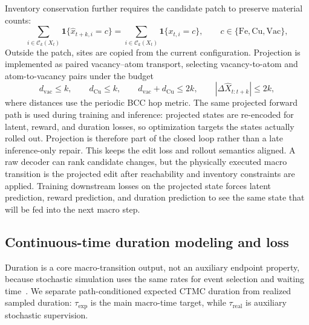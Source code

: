 \documentclass{article}
\begin{document}
Inventory conservation further requires the candidate patch to preserve material counts:
\begin{equation}
\sum_{i\in\mathcal{C}_k(X_t)}\mathbf{1}\{\hat{x}_{t+k,i}=c\}
=
\sum_{i\in\mathcal{C}_k(X_t)}\mathbf{1}\{x_{t,i}=c\},
\qquad c\in\{\mathrm{Fe},\mathrm{Cu},\mathrm{Vac}\},
\end{equation}
Outside the patch, sites are copied from the current configuration. Projection is implemented as paired vacancy--atom transport, selecting vacancy-to-atom and atom-to-vacancy pairs under the budget
\begin{equation}
d_{\mathrm{vac}}\leq k,\qquad d_{\mathrm{Cu}}\leq k,\qquad d_{\mathrm{vac}}+d_{\mathrm{Cu}}\leq 2k,\qquad |\Delta\hat{X}_{t:t+k}|\leq 2k,
\end{equation}
where distances use the periodic BCC hop metric. The same projected forward path is used during training and inference: projected states are re-encoded for latent, reward, and duration losses, so optimization targets the states actually rolled out. Projection is therefore part of the closed loop rather than a late inference-only repair.
This keeps the edit loss and rollout semantics aligned. A raw decoder can rank candidate changes, but the physically executed macro transition is the projected edit after reachability and inventory constraints are applied. Training downstream losses on the projected state forces latent prediction, reward prediction, and duration prediction to see the same state that will be fed into the next macro step.

\subsection{Continuous-time duration modeling and loss}

Duration is a core macro-transition output, not an auxiliary endpoint property, because stochastic simulation uses the same rates for event selection and waiting time~\cite{gillespie1976general,gillespie1977exact,fichthorn1991dmc,lin2019partialscaling}. We separate path-conditioned expected CTMC duration from realized sampled duration: $\tau_{\mathrm{exp}}$ is the main macro-time target, while $\tau_{\mathrm{real}}$ is auxiliary stochastic supervision.
\end{document}
